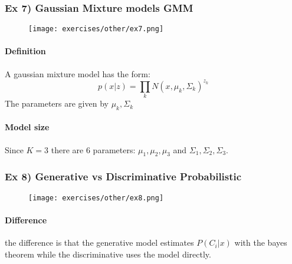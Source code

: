 \subsubsection{Ex 7) Gaussian Mixture models GMM}

\begin{figure}[H]
    \centering
    \texttt{[image: exercises/other/ex7.png]}
\end{figure}

\paragraph{Definition}
A gaussian mixture model has the form:
$$p(x|z)=\prod_k N(x,\mu_k,\Sigma_k)^{z_k}$$
The parameters are given by $\mu_k, \Sigma_k$

\paragraph{Model size }
Since $K=3$ there are 6 parameters: $\mu_1,\mu_2,\mu_3$ and $\Sigma_1,\Sigma_2,\Sigma_3$.

\subsubsection{Ex 8) Generative vs Discriminative Probabilistic}

\begin{figure}[H]
    \centering
    \texttt{[image: exercises/other/ex8.png]}
\end{figure}

\paragraph{Difference}
the difference is that the generative model estimates $P(C_i|x)$ with the bayes theorem while the discriminative uses the model directly.

